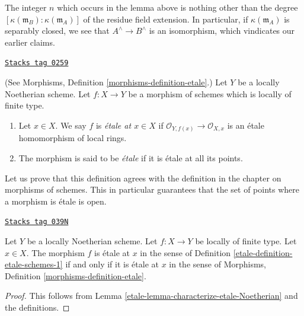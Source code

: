 The integer $n$ which occurs in the lemma above
is nothing other than the degree
$[\kappa(\mathfrak m_B) : \kappa(\mathfrak m_A)]$ of the residue field
extension. In particular, if $\kappa(\mathfrak m_A)$
is separably closed, we see that $A^\wedge \to B^\wedge$
is an isomorphism, which vindicates our earlier claims.

\begin{definition}
\label{etale-definition-etale-schemes-1}
\href{https://stacks.math.columbia.edu/tag/0259}{\texttt{Stacks tag 0259}}

(See Morphisms, Definition \ref{morphisms-definition-etale}.)
Let $Y$ be a locally Noetherian scheme.
Let $f : X \to Y$ be a morphism of schemes which is locally of finite type.
\begin{enumerate}
\item Let $x \in X$. We say $f$ is {\it \'etale at $x \in X$} if
$\mathcal{O}_{Y, f(x)} \to \mathcal{O}_{X, x}$ is an
\'etale homomorphism of local rings.
\item The morphism is said to be {\it \'etale} if it is \'etale at all its
points.
\end{enumerate}
\end{definition}

Let us prove that this definition agrees with the definition in the
chapter on morphisms of schemes. This in particular guarantees that the
set of points where a morphism is \'etale is open.

\begin{lemma}
\label{etale-lemma-etale-definition}
\href{https://stacks.math.columbia.edu/tag/039N}{\texttt{Stacks tag 039N}}

Let $Y$ be a locally Noetherian scheme.
Let $f : X \to Y$ be locally of finite type.
Let $x \in X$. The morphism $f$ is \'etale at $x$ in
the sense of Definition \ref{etale-definition-etale-schemes-1}
if and only if it is \'etale at $x$ in
the sense of Morphisms, Definition \ref{morphisms-definition-etale}.
\end{lemma}

\begin{proof}

This follows from Lemma \ref{etale-lemma-characterize-etale-Noetherian}
and the definitions.
\end{proof}

